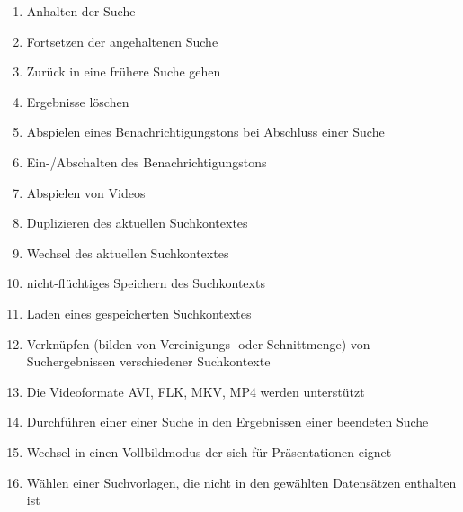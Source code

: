\begin{enumerate} [label=\bfseries /F \arabic*0/]
	\subsection{Wunsch}
	\item Anhalten der Suche
	\item Fortsetzen der angehaltenen Suche
	\item Zurück in eine frühere Suche gehen %
	\item Ergebnisse löschen %
	\item Abspielen eines Benachrichtigungstons bei Abschluss einer Suche
	\item Ein-/Abschalten des Benachrichtigungstons
	\item Abspielen von Videos
	\item Duplizieren des aktuellen Suchkontextes
	\item Wechsel des aktuellen Suchkontextes
	\item nicht-fl\"uchtiges Speichern des Suchkontexts
	\item Laden eines gespeicherten Suchkontextes
	\item Verkn\"upfen (bilden von Vereinigungs- oder Schnittmenge) von Suchergebnissen verschiedener Suchkontexte
	\item Die Videoformate AVI, FLK, MKV, MP4 werden unterst\"utzt
	\item Durchführen einer einer Suche in den Ergebnissen einer beendeten Suche
	\item Wechsel in einen Vollbildmodus der sich für Präsentationen eignet
	\item Wählen einer Suchvorlagen, die nicht in den gewählten Datensätzen enthalten ist
\end{enumerate}
